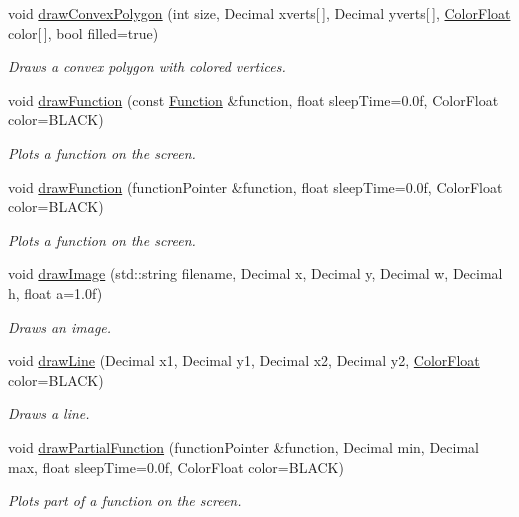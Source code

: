 \begin{DoxyCompactItemize}
void \hyperlink{classtsgl_1_1_cartesian_canvas_abefc7f373711cdff2477d0665b37212f}{draw\-Convex\-Polygon} (int size, Decimal xverts\mbox{[}$\,$\mbox{]}, Decimal yverts\mbox{[}$\,$\mbox{]}, \hyperlink{structtsgl_1_1_color_float}{Color\-Float} color\mbox{[}$\,$\mbox{]}, bool filled=true)
\begin{DoxyCompactList}\small\item\em Draws a convex polygon with colored vertices. \end{DoxyCompactList}\item 
void \hyperlink{classtsgl_1_1_cartesian_canvas_aa8c215b817d95e3e05ff26f835470c41}{draw\-Function} (const \hyperlink{classtsgl_1_1_function}{Function} \&function, float sleep\-Time=0.\-0f, Color\-Float color=\-B\-L\-A\-C\-K)
\begin{DoxyCompactList}\small\item\em Plots a function on the screen. \end{DoxyCompactList}\item 
void \hyperlink{classtsgl_1_1_cartesian_canvas_acf5536fbf6dca6df1fec719e13630a02}{draw\-Function} (function\-Pointer \&function, float sleep\-Time=0.\-0f, Color\-Float color=\-B\-L\-A\-C\-K)
\begin{DoxyCompactList}\small\item\em Plots a function on the screen. \end{DoxyCompactList}\item 
void \hyperlink{classtsgl_1_1_cartesian_canvas_ab2f3e7633f4f05711083eba01b0a3f4e}{draw\-Image} (std\-::string filename, Decimal x, Decimal y, Decimal w, Decimal h, float a=1.\-0f)
\begin{DoxyCompactList}\small\item\em Draws an image. \end{DoxyCompactList}\item 
void \hyperlink{classtsgl_1_1_cartesian_canvas_ace015a630f1ff280b2ecd6a864cdc5e2}{draw\-Line} (Decimal x1, Decimal y1, Decimal x2, Decimal y2, \hyperlink{structtsgl_1_1_color_float}{Color\-Float} color=B\-L\-A\-C\-K)
\begin{DoxyCompactList}\small\item\em Draws a line. \end{DoxyCompactList}\item 
void \hyperlink{classtsgl_1_1_cartesian_canvas_a8b0d9607230111dd6bef5bf270394b03}{draw\-Partial\-Function} (function\-Pointer \&function, Decimal min, Decimal max, float sleep\-Time=0.\-0f, Color\-Float color=\-B\-L\-A\-C\-K)
\begin{DoxyCompactList}\small\item\em Plots part of a function on the screen. \end{DoxyCompactList}\item 

\end{DoxyCompactItemize}
